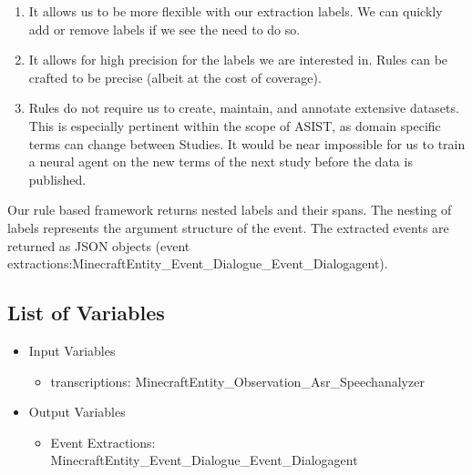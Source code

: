 \begin{enumerate}
 \item It allows us to be more flexible with our extraction labels. We can quickly add or remove labels if we see the need to do so.
 \item It allows for high precision for the labels we are interested in. Rules can be crafted to be precise (albeit at the cost of coverage).
 \item Rules do not require us to create, maintain, and annotate extensive datasets. This is especially pertinent within the scope of ASIST, as domain specific terms can change between Studies. It would be near impossible for us to train a neural agent on the new terms of the next study before the data is published.
\end{enumerate}

Our rule based framework returns nested labels and their spans. The nesting of labels represents the argument structure of the event. The extracted events are returned as JSON objects (event extractions:MinecraftEntity\_Event\_Dialogue\_Event\_Dialogagent). 


\subsection{List of Variables}
\begin{itemize}
    \item Input Variables
    \begin{itemize}
        \item transcriptions: MinecraftEntity\_Observation\_Asr\_Speechanalyzer
    \end{itemize}
    \item Output Variables
    \begin{itemize}
        \item Event Extractions: MinecraftEntity\_Event\_Dialogue\_Event\_Dialogagent
    \end{itemize}
\end{itemize}


